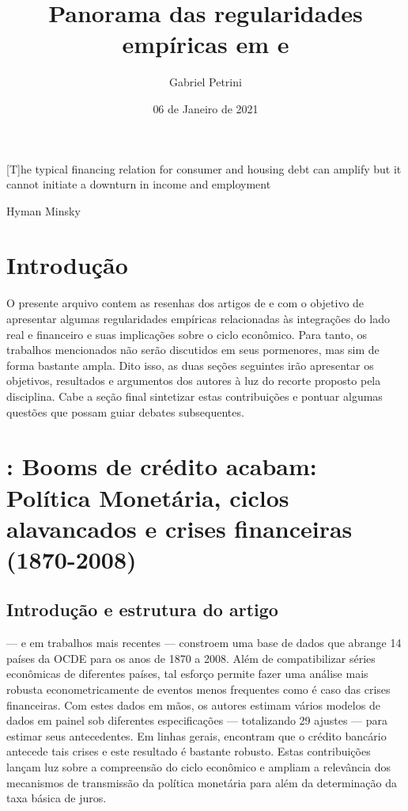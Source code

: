 \documentclass[11pt]{article}
\author{Gabriel Petrini}
\date{06 de Janeiro de 2021}
\title{Panorama das regularidades empíricas em \textcite{schularickCreditBoomsGone2012} e  \textcite{sharpe_2020_Why}}
\begin{document}
\maketitle


\epigraph{[T]he typical
financing relation for consumer and housing debt can amplify but it cannot initiate a
downturn in income and employment}{Hyman Minsky}

\section*{Introdução}
\label{sec:orge9bef32}

O presente arquivo contem as resenhas dos artigos de \textcite{schularickCreditBoomsGone2012} e \textcite{sharpe_2020_Why} com o objetivo de apresentar algumas regularidades empíricas relacionadas às integrações do lado real e financeiro e suas implicações sobre o ciclo econômico.
Para tanto, os trabalhos mencionados não serão discutidos em seus pormenores, mas sim de forma bastante ampla.
Dito isso, as duas seções seguintes irão apresentar os objetivos, resultados e argumentos dos autores à luz do recorte proposto pela disciplina.
Cabe a seção final sintetizar estas contribuições e pontuar algumas questões que possam guiar debates subsequentes.

\section*{\textcite{schularickCreditBoomsGone2012}: Booms de crédito acabam: Política Monetária, ciclos alavancados e crises financeiras (1870-2008)}
\label{sec:orge5f1cc5}

\subsection*{Introdução e estrutura do artigo}
\label{sec:org928ecc4}

\textcite{schularickCreditBoomsGone2012}  --- e em trabalhos mais recentes \cite{jordaGreatMortgagingHousing2016,jordaRateReturnEverything2019}--- constroem uma base de dados que abrange 14 países da OCDE para os anos de 1870 a 2008.
Além de compatibilizar séries econômicas de diferentes países, tal esforço permite fazer uma análise mais robusta econometricamente de eventos menos frequentes como é caso das crises financeiras.
Com estes dados em mãos, os autores estimam vários modelos de dados em painel sob diferentes especificações --- totalizando 29 ajustes --- para estimar seus antecedentes.
Em linhas gerais, encontram que o crédito bancário antecede tais crises e este resultado é bastante robusto.
Estas contribuições lançam luz sobre a compreensão do ciclo econômico e ampliam a relevância dos mecanismos de transmissão da política monetária para além da determinação da taxa básica de juros.
\end{document}

